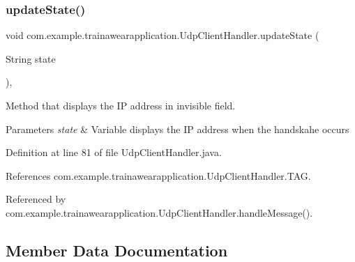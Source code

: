 \subsubsection{\texorpdfstring{updateState()}{updateState()}}
{\footnotesize\ttfamily void com.\+example.\+trainawearapplication.\+Udp\+Client\+Handler.\+update\+State (\begin{DoxyParamCaption}\item[{String}]{state }\end{DoxyParamCaption})\hspace{0.3cm}{\ttfamily [inline]}, {\ttfamily [private]}}



Method that displays the IP address in invisible field. 


\begin{DoxyParams}{Parameters}
{\em state} & Variable displays the IP address when the handskahe occurs \\
\hline
\end{DoxyParams}


Definition at line 81 of file Udp\+Client\+Handler.\+java.


\begin{DoxyCode}{0}

\end{DoxyCode}


References com.\+example.\+trainawearapplication.\+Udp\+Client\+Handler.\+T\+AG.



Referenced by com.\+example.\+trainawearapplication.\+Udp\+Client\+Handler.\+handle\+Message().



\subsection{Member Data Documentation}
\mbox{\label{classcom_1_1example_1_1trainawearapplication_1_1_udp_client_handler_a93942bc64a7d7d570d27c9e485d361e4}} 
